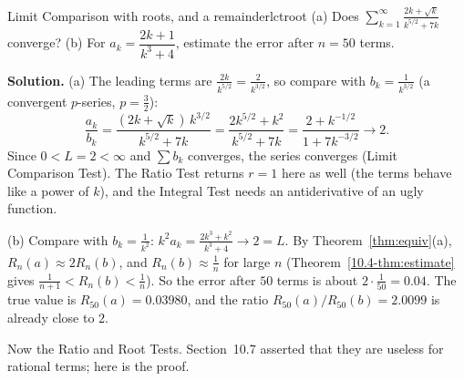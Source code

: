\documentclass[11pt]{article}
\begin{document}
\begin{exmp}{Limit Comparison with roots, and a remainder}{lctroot}
(a) Does $\displaystyle\sum_{k=1}^\infty\frac{2k+\sqrt k}{k^{5/2}+7k}$ converge? (b) For $a_k=\dfrac{2k+1}{k^3+4}$, estimate the error after $n=50$ terms.

\textbf{Solution.} (a) The leading terms are $\frac{2k}{k^{5/2}}=\frac2{k^{3/2}}$, so compare with $b_k=\frac1{k^{3/2}}$ (a convergent $p$-series, $p=\frac32$):
\[
\frac{a_k}{b_k}=\frac{(2k+\sqrt k)\,k^{3/2}}{k^{5/2}+7k}=\frac{2k^{5/2}+k^2}{k^{5/2}+7k}=\frac{2+k^{-1/2}}{1+7k^{-3/2}}\to2 .
\]
Since $0<L=2<\infty$ and $\sum b_k$ converges, the series converges (Limit Comparison Test). The Ratio Test returns $r=1$ here as well (the terms behave like a power of $k$), and the Integral Test needs an antiderivative of an ugly function.

(b) Compare with $b_k=\frac1{k^2}$: $k^2a_k=\frac{2k^3+k^2}{k^3+4}\to2=L$. By Theorem~\ref{thm:equiv}(a), $R_n(a)\approx2R_n(b)$, and $R_n(b)\approx\frac1n$ for large $n$ (Theorem~\ref{10.4-thm:estimate} gives $\frac1{n+1}<R_n(b)<\frac1n$). So the error after $50$ terms is about $2\cdot\frac1{50}=0.04$. The true value is $R_{50}(a)=0.03980$, and the ratio $R_{50}(a)/R_{50}(b)=2.0099$ is already close to $2$.
\end{exmp}

Now the Ratio and Root Tests. Section~10.7 asserted that they are useless for rational terms; here is the proof.
\end{document}
